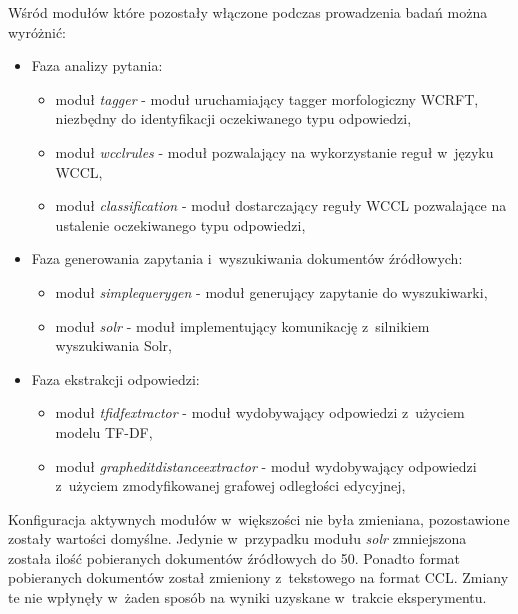 \documentclass[a4paper, twoside, 12pt]{report}
\begin{document}
        Wśród modułów które pozostały włączone podczas prowadzenia badań można wyróżnić:
        \begin{itemize}
            \item Faza analizy pytania:
                \begin{itemize}
                    \item moduł \emph{tagger} - moduł uruchamiający tagger morfologiczny WCRFT, niezbędny do identyfikacji
                        oczekiwanego typu odpowiedzi,
                    \item moduł \emph{wcclrules} - moduł pozwalający na wykorzystanie reguł w~języku WCCL,
                    \item moduł \emph{classification} - moduł dostarczający reguły WCCL pozwalające na ustalenie oczekiwanego
                        typu odpowiedzi,
                \end{itemize}
            \item Faza generowania zapytania i~wyszukiwania dokumentów źródłowych:
                \begin{itemize}
                    \item moduł \emph{simplequerygen} - moduł generujący zapytanie do wyszukiwarki,
                    \item moduł \emph{solr} - moduł implementujący komunikację z~silnikiem wyszukiwania Solr,
                \end{itemize}
            \item Faza ekstrakcji odpowiedzi:
                \begin{itemize}
                    \item moduł \emph{tfidfextractor} - moduł wydobywający odpowiedzi z~użyciem modelu TF-DF,
                    \item moduł \emph{grapheditdistanceextractor} - moduł wydobywający odpowiedzi z~użyciem zmodyfikowanej
                        grafowej odległości edycyjnej,
                \end{itemize}
        \end{itemize}

        Konfiguracja aktywnych modułów w~większości nie była zmieniana, pozostawione zostały wartości domyślne. Jedynie
        w~przypadku modułu \emph{solr} zmniejszona została ilość pobieranych dokumentów źródłowych do 50. Ponadto
        format pobieranych dokumentów został zmieniony z~tekstowego na format CCL. Zmiany te nie wpłynęły w~żaden
        sposób na wyniki uzyskane w~trakcie eksperymentu.
\end{document}
